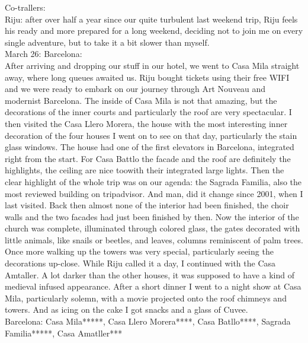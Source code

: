 Co-trallers:\\
Riju: after over half a year since our quite turbulent last weekend trip, Riju feels his ready and more prepared for a long weekend, deciding not to join me on every single adventure, but to take it a bit slower than myself.\\

March 26: Barcelona:\\
After arriving and dropping our stuff in our hotel, we went to Casa Mila straight away, where long queues awaited us. Riju bought tickets using their free WIFI and we were ready to embark on our journey through Art Nouveau and modernist Barcelona. The inside of Casa Mila is not that amazing, but the decorations of the inner courts and particularly the roof are very spectacular. I then visited the Casa Llero Morera, the house with the most interesting inner decoration of the four houses I went on to see on that day, particularly the stain glass windows. The house had one of the first elevators in Barcelona, integrated right from the start. For Casa Battlo the facade and the roof are definitely the highlights, the ceiling are nice toowith their integrated large lights. Then the clear highlight of the whole trip was on our agenda: the Sagrada Familia, also the most reviewed building on tripadvisor. And man, did it change since 2001, when I last visited. Back then almost none of the interior had been finished, the choir walls and the two facades had just been finished by then. Now the interior of the church was complete, illuminated through colored glass, the gates decorated with little animals, like snails or beetles, and leaves, columns reminiscent of palm trees. Once more walking up the towers was very special, particularly seeing the decorations up-close. While Riju called it a day, I continued with the Casa Amtaller. A lot darker than the other houses, it was supposed to have a kind of medieval infused appearance. After a short dinner I went to a night show at Casa Mila, particularly solemn, with a movie projected onto the roof chimneys and towers. And as icing on the cake I got snacks and a glass of Cuvee.\\

Barcelona: Casa Mila*****, Casa Llero Morera****, Casa Batllo****, Sagrada Familia*****, Casa Amatller***\\

